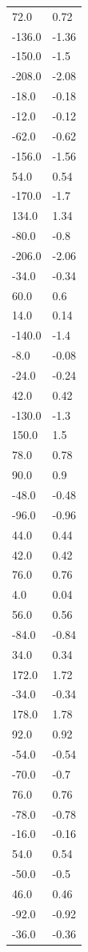 \begin{longtable}{ll}
72.0 & 0.72 \\
-136.0 & -1.36 \\
-150.0 & -1.5 \\
-208.0 & -2.08 \\
-18.0 & -0.18 \\
-12.0 & -0.12 \\
-62.0 & -0.62 \\
-156.0 & -1.56 \\
54.0 & 0.54 \\
-170.0 & -1.7 \\
134.0 & 1.34 \\
-80.0 & -0.8 \\
-206.0 & -2.06 \\
-34.0 & -0.34 \\
60.0 & 0.6 \\
14.0 & 0.14 \\
-140.0 & -1.4 \\
-8.0 & -0.08 \\
-24.0 & -0.24 \\
42.0 & 0.42 \\
-130.0 & -1.3 \\
150.0 & 1.5 \\
78.0 & 0.78 \\
90.0 & 0.9 \\
-48.0 & -0.48 \\
-96.0 & -0.96 \\
44.0 & 0.44 \\
42.0 & 0.42 \\
76.0 & 0.76 \\
4.0 & 0.04 \\
56.0 & 0.56 \\
-84.0 & -0.84 \\
34.0 & 0.34 \\
172.0 & 1.72 \\
-34.0 & -0.34 \\
178.0 & 1.78 \\
92.0 & 0.92 \\
-54.0 & -0.54 \\
-70.0 & -0.7 \\
76.0 & 0.76 \\
-78.0 & -0.78 \\
-16.0 & -0.16 \\
54.0 & 0.54 \\
-50.0 & -0.5 \\
46.0 & 0.46 \\
-92.0 & -0.92 \\
-36.0 & -0.36 \\

\end{longtable}
